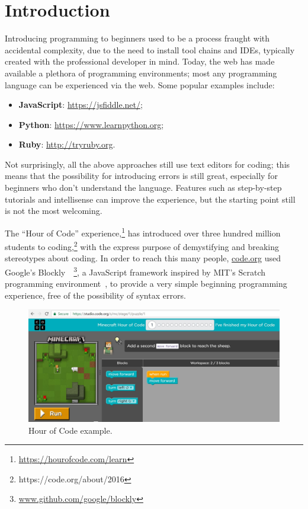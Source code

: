 \section{Introduction}


Introducing programming to beginners used to be a process fraught with
accidental complexity, due to the need to install tool chains and IDEs, 
typically created with the professional developer in mind. Today, 
the web has made available a plethora of programming environments;
most any programming language can be experienced via the web. 
Some popular examples include:
\begin{itemize}
\item {\bf JavaScript}: \url{https://jsfiddle.net/};
\item {\bf Python}: \url{https://www.learnpython.org};
\item {\bf Ruby}: \url{http://tryruby.org}.
\end{itemize}
Not surprisingly, all the above approaches still use text editors for coding;
this means that the possibility for introducing errors is still great, especially 
for beginners who don't understand the language. Features such as step-by-step 
tutorials and intellisense can improve the experience, but the starting point still 
is not the most welcoming. 


The ``Hour of Code'' experience,\footnote{\url{https://hourofcode.com/learn}} 
has introduced over three hundred million students to coding,\footnote{https://code.org/about/2016} 
with the express  purpose of demystifying and breaking stereotypes about coding.
In order to reach this many people, \url{code.org} used
Google's Blockly~\cite{Blocky2015}~\footnote{\url{www.github.com/google/blockly}},
a JavaScript framework inspired by MIT's Scratch programming 
environment~\cite{ScratchCACM2009},
to provide a very simple beginning programming experience, 
free of the possibility of syntax errors. 

\begin{figure}[t]
    \includegraphics[width=\columnwidth]{pics/hourofcode}
\caption{\label{fig:hoc}Hour of Code example.}
\end{figure}

